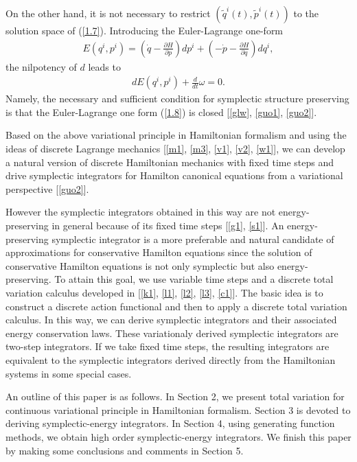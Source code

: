 \documentclass[a4paper,a4paper]{article}
\begin{document}
On the other hand, it is not necessary to restrict $(\tilde{q}^{i}(t),
\tilde{p}^{i}(t))$ to the solution space of (\ref{1.7}). Introducing the Euler-Lagrange
one-form
\begin{align}
           E(q^{i}, p^{i})=\left(\dot{q}-\frac{\partial H}{\partial p}\right)
          dp^{i}+\left(-\dot{p}-\frac{\partial H}{\partial q}\right)dq^{i}, \label{1.8}
\end{align}
the nilpotency of $d$ leads to
\begin{align}
  dE(q^{i}, p^{i})+\frac{d}{dt}\omega=0.\label{1.9}
\end{align}
Namely, the necessary and sufficient condition for symplectic
structure preserving is that the Euler-Lagrange one form
(\ref{1.8}) is closed [\ref{glw}, \ref{guo1}, \ref{guo2}].

Based on the above variational principle in Hamiltonian formalism and using
the ideas of discrete Lagrange mechanics
[\ref{m1}, \ref{m3}, \ref{v1}, \ref{v2}, \ref{w1}],
we can develop a natural version
of discrete Hamiltonian mechanics with fixed time steps and drive symplectic
integrators for Hamilton canonical equations from a variational perspective
[\ref{guo2}].

 However the symplectic integrators
obtained in this way are not energy-preserving in general because of its fixed
time steps [\ref{g1}, \ref{s1}].
 An energy-preserving symplectic  integrator
is a more preferable and natural candidate of approximations for
conservative Hamilton equations  since the solution of
conservative Hamilton equations is not only symplectic but also
energy-preserving. To attain this goal, we use variable time steps
and a discrete total variation calculus developed in [\ref{k1},
\ref{l1}, \ref{l2}, \ref{l3}, \ref{c1}]. The basic idea is to
construct a discrete action functional and then to apply a
discrete total variation calculus. In this way, we can derive
symplectic integrators and their associated energy conservation
laws. These variationaly derived symplectic integrators are
two-step integrators. If we take fixed time steps, the resulting
integrators are equivalent to the symplectic integrators derived
directly from the Hamiltonian systems in some special cases.

An outline of this paper is as follows. In Section 2, we
present total variation for continuous variational principle in Hamiltonian
formalism.  Section 3 is devoted to deriving symplectic-energy integrators.
In Section 4, using generating function methods, we obtain high order
symplectic-energy integrators.
 We finish this paper by making some conclusions and comments in Section 5.
\end{document}
